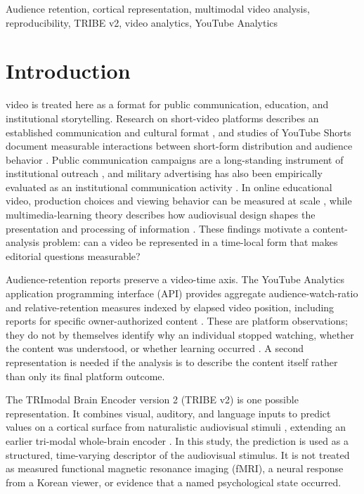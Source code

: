 \documentclass{ieeeaccess}
\begin{document}
\begin{keywords}
Audience retention, cortical representation, multimodal video analysis, reproducibility, TRIBE v2, video analytics, YouTube Analytics
\end{keywords}

\titlepgskip=-21pt
\maketitle

\section{Introduction}
\label{sec:introduction}
 video is treated here as a format for public communication, education, and institutional storytelling. Research on short-video platforms describes an established communication and cultural format \cite{kaye2022tiktok}, and studies of YouTube Shorts document measurable interactions between short-form distribution and audience behavior \cite{rajendran2024shorts}. Public communication campaigns are a long-standing instrument of institutional outreach \cite{rice2013campaigns}, and military advertising has also been empirically evaluated as an institutional communication activity \cite{dertouzos2003military}. In online educational video, production choices and viewing behavior can be measured at scale \cite{guo2014video,breslow2013studying}, while multimedia-learning theory describes how audiovisual design shapes the presentation and processing of information \cite{mayer2009multimedia}. These findings motivate a content-analysis problem: can a video be represented in a time-local form that makes editorial questions measurable?

Audience-retention reports preserve a video-time axis. The YouTube Analytics application programming interface (API) provides aggregate audience-watch-ratio and relative-retention measures indexed by elapsed video position, including reports for specific owner-authorized content \cite{youtubeRetentionAPI}. These are platform observations; they do not by themselves identify why an individual stopped watching, whether the content was understood, or whether learning occurred \cite{gasevic2015learning}. A second representation is needed if the analysis is to describe the content itself rather than only its final platform outcome.

The TRImodal Brain Encoder version 2 (TRIBE v2) is one possible representation. It combines visual, auditory, and language inputs to predict values on a cortical surface from naturalistic audiovisual stimuli \cite{dascoli2026tribev2}, extending an earlier tri-modal whole-brain encoder \cite{dascoli2025tribe}. In this study, the prediction is used as a structured, time-varying descriptor of the audiovisual stimulus. It is not treated as measured functional magnetic resonance imaging (fMRI), a neural response from a Korean viewer, or evidence that a named psychological state occurred.
\end{document}
